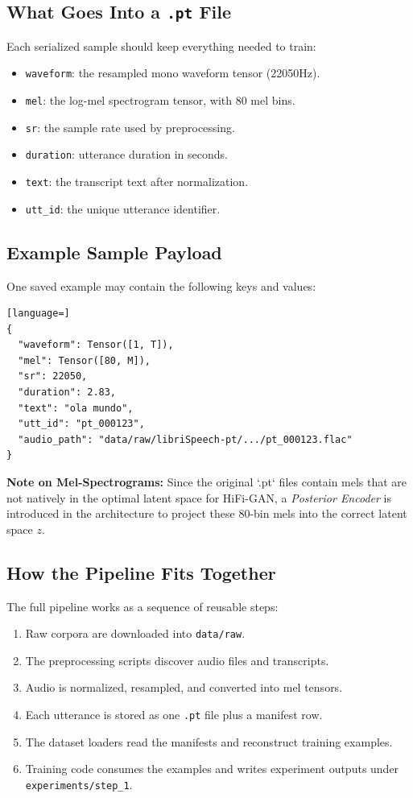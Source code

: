 \documentclass[11pt]{article}
\newcommand{\pathtt}[1]{\texttt{#1}}
\begin{document}
\subsection{What Goes Into a \pathtt{.pt} File}
Each serialized sample should keep everything needed to train:
\begin{itemize}[leftmargin=1.5em]
  \item \pathtt{waveform}: the resampled mono waveform tensor (22050Hz).
  \item \pathtt{mel}: the log-mel spectrogram tensor, with 80 mel bins.
  \item \pathtt{sr}: the sample rate used by preprocessing.
  \item \pathtt{duration}: utterance duration in seconds.
  \item \pathtt{text}: the transcript text after normalization.
  \item \pathtt{utt\_id}: the unique utterance identifier.
\end{itemize}

\subsection{Example Sample Payload}
One saved example may contain the following keys and values:

\begin{lstlisting}[language=]
{
  "waveform": Tensor([1, T]),
  "mel": Tensor([80, M]),
  "sr": 22050,
  "duration": 2.83,
  "text": "ola mundo",
  "utt_id": "pt_000123",
  "audio_path": "data/raw/libriSpeech-pt/.../pt_000123.flac"
}
\end{lstlisting}

\textbf{Note on Mel-Spectrograms:} Since the original `.pt` files contain mels that are not natively in the optimal latent space for HiFi-GAN, a \textit{Posterior Encoder} is introduced in the architecture to project these 80-bin mels into the correct latent space $z$.

\subsection{How the Pipeline Fits Together}
The full pipeline works as a sequence of reusable steps:

\begin{enumerate}[leftmargin=1.5em]
  \item Raw corpora are downloaded into \pathtt{data/raw}.
  \item The preprocessing scripts discover audio files and transcripts.
  \item Audio is normalized, resampled, and converted into mel tensors.
  \item Each utterance is stored as one \pathtt{.pt} file plus a manifest row.
  \item The dataset loaders read the manifests and reconstruct training examples.
  \item Training code consumes the examples and writes experiment outputs under \pathtt{experiments/step\_1}.
\end{enumerate}
\end{document}
